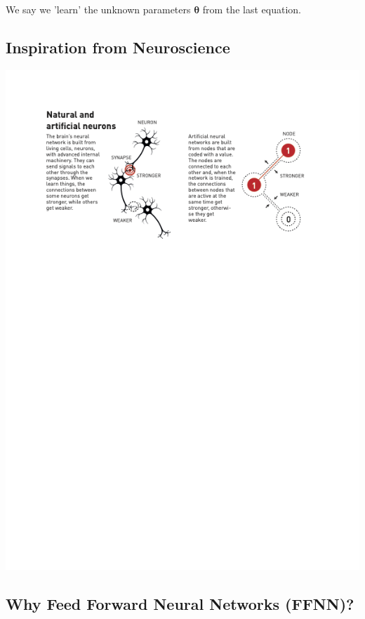 \documentclass[%
oneside,                 %
final,                   %
10pt]{article}
\begin{document}
We say we 'learn' the unknown parameters $\bm{\theta}$ from the last equation.

\subsection{Inspiration from Neuroscience}

\vspace{6mm}

\centerline{\includegraphics[width=1.0\linewidth]{figures/neuronandnn.png}}

\vspace{6mm}

\subsection{Why Feed Forward Neural Networks (FFNN)?}
\end{document}
